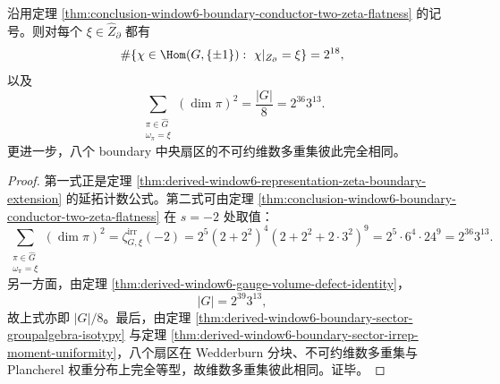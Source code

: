 \begin{corollary}\label{cor:conclusion-window6-boundary-conductor-two-plancherel-uniformity}
沿用定理 \ref{thm:conclusion-window6-boundary-conductor-two-zeta-flatness} 的记号。则对每个 \(\xi\in\widehat Z_{\partial}\) 都有
\[
\#\{\chi\in \Hom(G,\{\pm1\}):\ \chi|_{Z_{\partial}}=\xi\}=2^{18},
\]
以及
\[
\sum_{\substack{\pi\in\widehat G\\ \omega_\pi=\xi}}(\dim\pi)^2
=
\frac{|G|}{8}
=
2^{36}3^{13}.
\]
更进一步，八个 boundary 中央扇区的不可约维数多重集彼此完全相同。
\end{corollary}
\begin{proof}
第一式正是定理 \ref{thm:derived-window6-representation-zeta-boundary-extension} 的延拓计数公式。第二式可由定理 \ref{thm:conclusion-window6-boundary-conductor-two-zeta-flatness} 在 \(s=-2\) 处取值：
\[
\sum_{\substack{\pi\in\widehat G\\ \omega_\pi=\xi}}(\dim\pi)^2
=
\zeta^{\mathrm{irr}}_{G,\xi}(-2)
=
2^5(2+2^2)^4(2+2^2+2\cdot 3^2)^9
=
2^5\cdot 6^4\cdot 24^9
=
2^{36}3^{13}.
\]
另一方面，由定理 \ref{thm:derived-window6-gauge-volume-defect-identity}，
\[
|G|=2^{39}3^{13},
\]
故上式亦即 \(|G|/8\)。最后，由定理 \ref{thm:derived-window6-boundary-sector-groupalgebra-isotypy} 与定理 \ref{thm:derived-window6-boundary-sector-irrep-moment-uniformity}，八个扇区在 Wedderburn 分块、不可约维数多重集与 Plancherel 权重分布上完全等型，故维数多重集彼此相同。证毕。
\end{proof}

